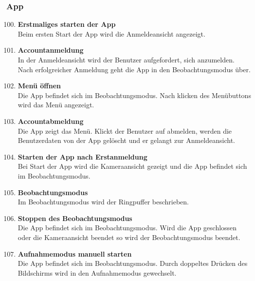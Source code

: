 \subsubsection{\gls{App}}
\begin{enumerate}[\bfseries{T}10]  
\setcounter{enumi}{99}{}

\item \textbf{Erstmaliges starten der \gls{App}} \hfill\\  
Beim ersten Start der \gls{App} wird die Anmeldeansicht angezeigt.

\item \textbf{Accountanmeldung} \hfill\\  
In der Anmeldeansicht wird der Benutzer aufgefordert, sich anzumelden. Nach erfolgreicher Anmeldung geht die \gls{App} in den Beobachtungsmodus \"uber.

\item \textbf{Men\"u \"offnen} \hfill\\
Die \gls{App} befindet sich im Beobachtungsmodus. Nach klicken des Men\"ubuttons wird das Men\"u angezeigt.

\item \textbf{Accountabmeldung} \hfill\\  
Die \gls{App} zeigt das Men\"u. Klickt der Benutzer auf abmelden, werden die Benutzerdaten von der \gls{App} gelöscht und er gelangt zur Anmeldeansicht.

\item \textbf{Starten der \gls{App} nach Erstanmeldung} \hfill\\  
Bei Start der \gls{App} wird die Kameraansicht gezeigt und die \gls{App} befindet sich im Beobachtungsmodus.

\item \textbf{Beobachtungsmodus} \hfill\\
Im Beobachtungsmodus wird der \gls{Ringpuffer} beschrieben.

\item \textbf{Stoppen des Beobachtungsmodus} \hfill\\  
Die \gls{App} befindet sich im Beobachtungsmodus. Wird die \gls{App} geschlossen oder die Kameraansicht beendet so wird der Beobachtungsmodus beendet.

\item \textbf{Aufnahmemodus manuell starten} \hfill\\
Die \gls{App} befindet sich im Beobachtungsmodus. Durch doppeltes Dr\"ucken des Bildschirms wird in den Aufnahmemodus gewechselt. 


\end{enumerate}
